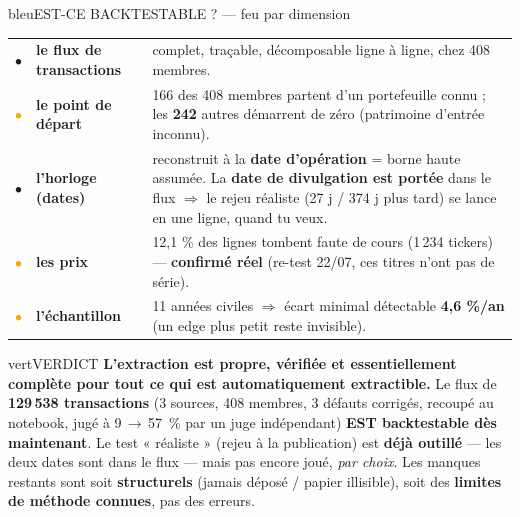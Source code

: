 \documentclass[10pt,a4paper]{article}
\newcommand{\feu}[1]{\textcolor{#1}{\Large$\bullet$}}
\newcommand{\fv}{\feu{vert}}\newcommand{\fo}{\feu{orange}}\newcommand{\fr}{\feu{rouge}}
\begin{document}
\newpage

\begin{bloc}{bleu}{EST-CE BACKTESTABLE ? --- feu par dimension}
\footnotesize
\begin{tabular}{@{}c l p{10.6cm}@{}}
\fv & \textbf{le flux de transactions} & complet, traçable, décomposable ligne à ligne, chez 408 membres.\\[0.6mm]
\fo & \textbf{le point de départ} & 166 des 408 membres partent d'un portefeuille connu ; les \textbf{242} autres démarrent de zéro (patrimoine d'entrée inconnu).\\[0.6mm]
\fv & \textbf{l'horloge (dates)} & reconstruit à la \textbf{date d'opération} = borne haute assumée. La \textbf{date de divulgation est portée} dans le flux $\Rightarrow$ le rejeu réaliste (27 j / 374 j plus tard) se lance en une ligne, quand tu veux.\\[0.6mm]
\fo & \textbf{les prix} & 12,1 \% des lignes tombent faute de cours (1\,234 tickers) --- \textbf{confirmé réel} (re-test 22/07, ces titres n'ont pas de série).\\[0.6mm]
\fo & \textbf{l'échantillon} & 11 années civiles $\Rightarrow$ écart minimal détectable \textbf{4,6 \%/an} (un edge plus petit reste invisible).\\
\end{tabular}
\end{bloc}

\begin{bloc}{vert}{VERDICT}
\footnotesize
\textbf{L'extraction est propre, vérifiée et essentiellement complète pour tout ce qui est automatiquement
extractible.} Le flux de \textbf{129\,538 transactions} (3 sources, 408 membres, 3 défauts corrigés, recoupé
au notebook, jugé à 9\,$\rightarrow$\,57~\% par un juge indépendant) \textbf{EST backtestable dès maintenant}.
Le test « réaliste » (rejeu à la publication) est \textbf{déjà outillé} --- les deux dates sont dans le flux ---
mais pas encore joué, \emph{par choix}. Les manques restants sont soit \textbf{structurels} (jamais déposé /
papier illisible), soit des \textbf{limites de méthode connues}, pas des erreurs.
\end{bloc}
\end{document}
